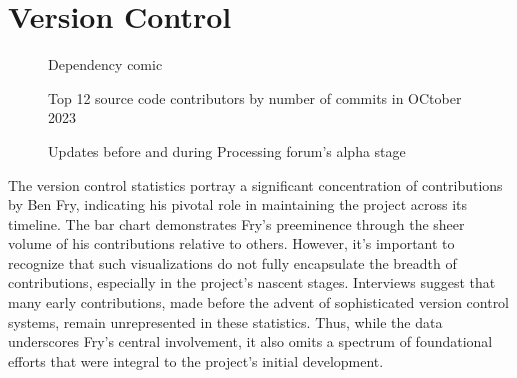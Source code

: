 \cleardoublepage
\changepapersize{305.3mm:210mm}

\thispagestyle{empty}
\begingroup
\raggedright 
{}
\section*{Version Control} 
\fontsize{12pt}{14pt}\selectfont
{}
\endgroup

\newpage
{}



\noindent
	\begin{minipage}[t]{0.15\textwidth}
		\noindent
		\begin{figure}[H]
			\caption{Dependency comic}
			\label{fig:dependency_comic}
		\end{figure}
	\end{minipage}
	\hspace{2mm}
	\begin{minipage}[t]{0.442\textwidth}
		\begin{figure}[H]
			\frame{}
			\caption[Top souce code contributors]{Top 12 source code contributors by number of commits in OCtober 2023}
			\label{fig:top12-github}
		\end{figure}
	\end{minipage}
\vspace{0.1cm}
\begin{figure}[H]
	\frame{}
	\caption[Early commits]{Updates before and during Processing forum's alpha stage}
	\label{fig:alpha-commits}
\end{figure}

\begin{multicols}{3}
	\noindent	
	The version control statistics portray a significant concentration of contributions by Ben Fry, indicating his pivotal role in maintaining the project across its timeline. The bar chart demonstrates Fry's preeminence through the sheer volume of his contributions relative to others. However, it's important to recognize that such visualizations do not fully encapsulate the breadth of contributions, especially in the project's nascent stages. Interviews suggest that many early contributions, made before the advent of sophisticated version control systems, remain unrepresented in these statistics. Thus, while the data underscores Fry's central involvement, it also omits a spectrum of foundational efforts that were integral to the project's initial development.
	\vfill\null
\end{multicols}

